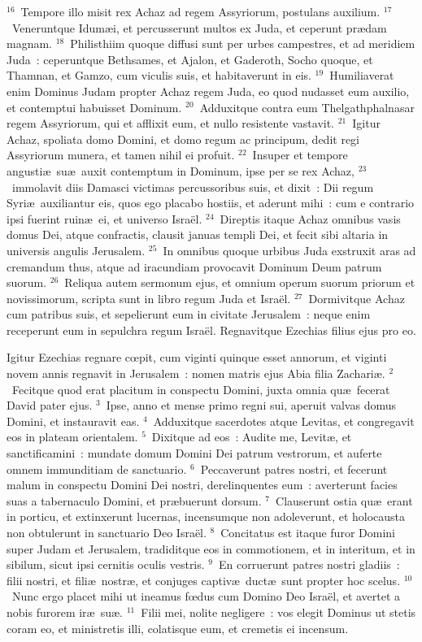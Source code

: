 ${}^{16}$~Tempore illo misit rex Achaz ad regem Assyriorum, postulans auxilium.
${}^{17}$~Veneruntque Idum\ae i, et percusserunt multos ex Juda, et ceperunt pr\ae dam magnam.
${}^{18}$~Philisthiim quoque diffusi sunt per urbes campestres, et ad meridiem Juda~: ceperuntque Bethsames, et Ajalon, et Gaderoth, Socho quoque, et Thamnan, et Gamzo, cum viculis suis, et habitaverunt in eis.
${}^{19}$~Humiliaverat enim Dominus Judam propter Achaz regem Juda, eo quod nudasset eum auxilio, et contemptui habuisset Dominum.
${}^{20}$~Adduxitque contra eum Thelgathphalnasar regem Assyriorum, qui et afflixit eum, et nullo resistente vastavit.
${}^{21}$~Igitur Achaz, spoliata domo Domini, et domo regum ac principum, dedit regi Assyriorum munera, et tamen nihil ei profuit.
${}^{22}$~Insuper et tempore angusti\ae\ su\ae\ auxit contemptum in Dominum, ipse per se rex Achaz,
${}^{23}$~immolavit diis Damasci victimas percussoribus suis, et dixit~: Dii regum Syri\ae\ auxiliantur eis, quos ego placabo hostiis, et aderunt mihi~: cum e contrario ipsi fuerint ruin\ae\ ei, et universo Isra\"el.
${}^{24}$~Direptis itaque Achaz omnibus vasis domus Dei, atque confractis, clausit januas templi Dei, et fecit sibi altaria in universis angulis Jerusalem.
${}^{25}$~In omnibus quoque urbibus Juda exstruxit aras ad cremandum thus, atque ad iracundiam provocavit Dominum Deum patrum suorum.
${}^{26}$~Reliqua autem sermonum ejus, et omnium operum suorum priorum et novissimorum, scripta sunt in libro regum Juda et Isra\"el.
${}^{27}$~Dormivitque Achaz cum patribus suis, et sepelierunt eum in civitate Jerusalem~: neque enim receperunt eum in sepulchra regum Isra\"el. Regnavitque Ezechias filius ejus pro eo.

\bchapter
\lettrine[lines=3,image=true,loversize=0.05,lraise=-0.03]{I}{}gitur Ezechias regnare cœpit, cum viginti quinque esset annorum, et viginti novem annis regnavit in Jerusalem~: nomen matris ejus Abia filia Zachari\ae .
${}^{2}$~Fecitque quod erat placitum in conspectu Domini, juxta omnia qu\ae\ fecerat David pater ejus.
${}^{3}$~Ipse, anno et mense primo regni sui, aperuit valvas domus Domini, et instauravit eas.
${}^{4}$~Adduxitque sacerdotes atque Levitas, et congregavit eos in plateam orientalem.
${}^{5}$~Dixitque ad eos~: Audite me, Levit\ae , et sanctificamini~: mundate domum Domini Dei patrum vestrorum, et auferte omnem immunditiam de sanctuario.
${}^{6}$~Peccaverunt patres nostri, et fecerunt malum in conspectu Domini Dei nostri, derelinquentes eum~: averterunt facies suas a tabernaculo Domini, et pr\ae buerunt dorsum.
${}^{7}$~Clauserunt ostia qu\ae\ erant in porticu, et extinxerunt lucernas, incensumque non adoleverunt, et holocausta non obtulerunt in sanctuario Deo Isra\"el.
${}^{8}$~Concitatus est itaque furor Domini super Judam et Jerusalem, tradiditque eos in commotionem, et in interitum, et in sibilum, sicut ipsi cernitis oculis vestris.
${}^{9}$~En corruerunt patres nostri gladiis~: filii nostri, et fili\ae\ nostr\ae , et conjuges captiv\ae\ duct\ae\ sunt propter hoc scelus.
${}^{10}$~Nunc ergo placet mihi ut ineamus fœdus cum Domino Deo Isra\"el, et avertet a nobis furorem ir\ae\ su\ae .
${}^{11}$~Filii mei, nolite negligere~: vos elegit Dominus ut stetis coram eo, et ministretis illi, colatisque eum, et cremetis ei incensum.


